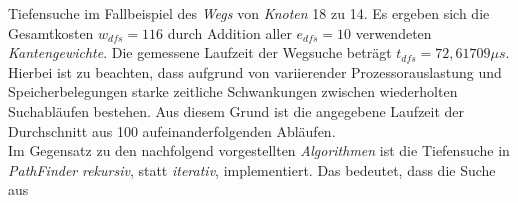 \documentclass[12pt]{article}
\begin{document}
Tiefensuche im Fallbeispiel des \textit{Wegs} von \textit{Knoten} 18 zu 14. Es ergeben sich die Gesamtkosten $w_{dfs} = 116$ durch Addition aller $e_{dfs} = 10$ verwendeten \textit{Kantengewichte}. Die gemessene Laufzeit der Wegsuche beträgt $t_{dfs} = 72,61709\mu s$. Hierbei ist zu beachten, dass aufgrund von variierender Prozessorauslastung und Speicherbelegungen starke zeitliche Schwankungen zwischen wiederholten Suchabläufen bestehen. Aus diesem Grund ist die angegebene Laufzeit der Durchschnitt aus 100 aufeinanderfolgenden Abläufen.
\\
Im Gegensatz zu den nachfolgend vorgestellten \textit{Algorithmen} ist die Tiefensuche in \textit{PathFinder} \textit{rekursiv}, statt \textit{iterativ}, implementiert. Das bedeutet, dass die Suche aus
\end{document}

